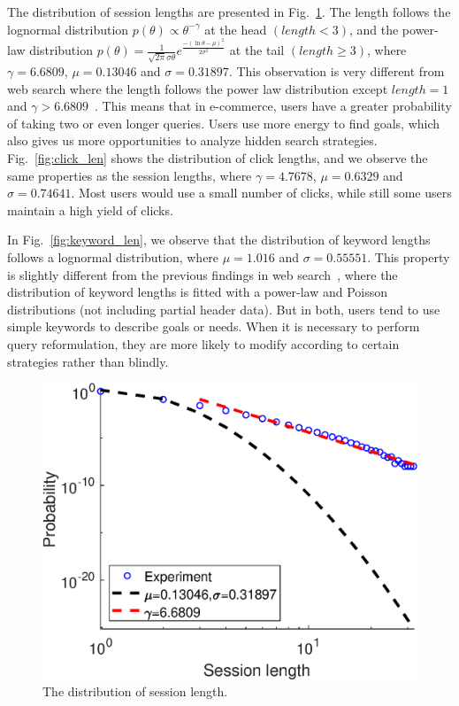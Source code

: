 \documentclass[sigconf,anonymous]{acmart}
\theoremstyle{definition}
\begin{document}
The distribution of session lengths are presented in Fig.~\ref{fig:session_len}. The length follows the lognormal distribution $p(\theta)\propto \theta^{-\gamma}$ at the head $(length<3)$, and the power-law distribution $p(\theta)= \frac{1}{\sqrt{2\pi}\sigma\theta}e^{\frac{-(\ln{\theta}-\mu)^2}{2\sigma^2}}$ at the tail $(length\ge3)$, where $\gamma=6.6809$, $\mu=0.13046$ and $\sigma=0.31897$. This observation is very different from web search where the length follows the power law distribution except $length=1$ and $\gamma>6.6809$~\cite{Cao2008Context,Cao2009Context}. This means that in e-commerce, users have a greater probability of taking two or even longer queries. Users use more energy to find goals, which also gives us more opportunities to analyze hidden search strategies. Fig.~\ref{fig:click_len} shows the distribution of click lengths, and we observe the same properties as the session lengths, where $\gamma=4.7678$, $\mu=0.6329$ and $\sigma=0.74641$. Most users would use a small number of clicks, while still some users maintain a high yield of clicks.

In Fig.~\ref{fig:keyword_len}, we observe that the distribution of keyword lengths follows a lognormal distribution, where $\mu=1.016$ and $\sigma=0.55551$. This property is slightly different from the previous findings in web search~\cite{Arampatzis2008A,Kramar2013Personalizing}, where the distribution of keyword lengths is fitted with a power-law and Poisson distributions (not including partial header data). But in both, users tend to use simple keywords to describe goals or needs. When it is necessary to perform query reformulation, they are more likely to modify according to certain strategies rather than blindly.

\begin{figure}[htbp]
\centering
\includegraphics[scale=0.35]{session_count.eps}
\vspace*{-5pt}
\caption{The distribution of session length.}\label{fig:session_len}
\end{figure}
\end{document}
